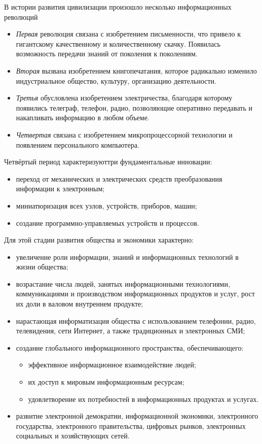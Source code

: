 
В истории развития цивилизации произошло несколько информационных революций
\begin{itemize}
    \item \emph{Первая} революция связана с изобретением письменности, что привело к гигантскому 
        качественному и количественному скачку. Появилась возможность передачи знаний от поколения к 
        поколениям.
    \item \emph{Вторая} вызвана изобретением книгопечатания, которое радикально изменило индустриальное 
        общество, культуру, организацию деятельности.
    \item \emph{Третья} обусловлена изобретением электричества, благодаря которому появились телеграф, 
        телефон, радио, позволяющие оперативно передавать и накапливать информацию в любом объеме.
    \item \emph{Четвертая} связана с изобретением микропроцессорной технологии и появлением персонального 
        компьютера.
\end{itemize}

Четвёртый период характеризуюттри фундаментальные инновации:
\begin{itemize}
    \item переход от механических и электрических средств преобразования информации к электронным;
    \item миниатюризация всех узлов, устройств, приборов, машин;
    \item создание программно-управляемых устройств и процессов.
\end{itemize}

Для этой стадии развития общества и экономики характерно:
\begin{itemize}
    \item увеличение роли информации, знаний и информационных технологий в жизни общества;
    \item возрастание числа людей, занятых информационными технологиями, коммуникациями и производством 
        информационных продуктов и услуг, рост их доли в валовом внутреннем продукте;
    \item нарастающая информатизация общества с использованием телефонии, радио, телевидения, сети Интернет, 
        а также традиционных и электронных СМИ;
    \item создание глобального информационного пространства, обеспечивающего:
    \begin{itemize}
        \item эффективное информационное взаимодействие людей;
        \item их доступ к мировым информационным ресурсам;
        \item удовлетворение их потребностей в информационных продуктах и услугах.
    \end{itemize}
    \item развитие электронной демократии, информационной экономики, электронного государства, электронного 
        правительства, цифровых рынков, электронных социальных и хозяйствующих сетей.
\end{itemize}